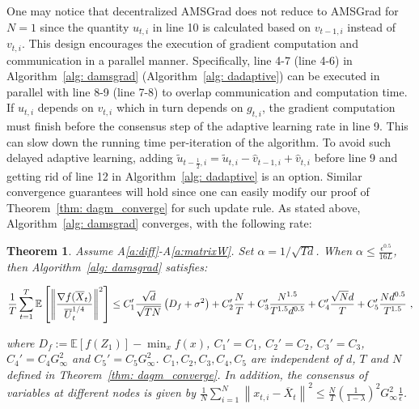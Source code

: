 \documentclass[11pt]{article}
\newtheorem{theorem}{Theorem}
\begin{document}
One may notice that decentralized AMSGrad does not reduce to AMSGrad for $N=1$ since the quantity $u_{t,i}$ in line 10 is calculated based on $v_{t-1,i}$ instead of $v_{t,i}$.
This design encourages the execution of gradient computation and communication in a parallel manner. 
Specifically, line 4-7 (line 4-6) in Algorithm~\ref{alg: damsgrad} (Algorithm~\ref{alg: dadaptive}) can be executed in parallel with line 8-9 (line 7-8) to overlap communication and computation time. 
If $u_{t,i}$ depends on $v_{t,i}$ which in turn depends on $g_{t,i}$, the gradient computation must finish before the consensus step of the adaptive learning rate in line 9. 
This can slow down the running time per-iteration of the algorithm. 
To avoid such delayed adaptive learning, adding $\tilde u_{t-\frac{1}{2},i} = \tilde u_{t,i} - \hat v_{t-1,i} + \hat v_{t,i}$ before line 9 and getting rid of line 12 in Algorithm~\ref{alg: dadaptive} is an option.
Similar convergence guarantees will hold since one can easily modify our proof of Theorem~\ref{thm: dagm_converge} for such update rule. 
As stated above, Algorithm~\ref{alg: damsgrad} converges, with the following rate:
\begin{theorem}\label{thm: dams_converge}
Assume A\ref{a:diff}-A\ref{a:matrixW}.
Set $\alpha = 1/\sqrt{Td}$. When $\alpha  \leq \frac{\epsilon^{0.5}}{16L} $, then Algorithm~\ref{alg: damsgrad} satisfies:
 
	  \begin{align}\notag
	  \frac{1}{T}\sum_{t=1}^T  \mathbb E \left [\left\|\frac{\nabla f( \overline X_{t})}{\overline U_{t}^{1/4}}\right\|^2  \right]
	  \leq  C_1' \frac{\sqrt{d}}{\sqrt{TN}} \left(D_f +    \sigma^2 \right) +  C_2' \frac{N}{T}  +  C_3' \frac{N^{1.5}}{T^{1.5}d^{0.5}} 
+  C_4' \frac{\sqrt{N}d}{T} +  C_5'  \frac{Nd^{0.5}}{T^{1.5}}  \ ,
	  \end{align}
	  
	where $D_f := \mathbb E  [f( Z_{1})]  -  \min_x  f(x)$, $C_1' = C_1$, $C_2' = C_2$, $C_3' = C_3$, $C_4' = C_4G_{\infty}^2$ and $C_5' = C_5 G_{\infty}^2 $. $C_1,C_2, C_3, C_4, C_5$ are independent of $d$, $T$ and $N$ defined in Theorem~\ref{thm: dagm_converge}. In addition, the consensus of variables at different nodes is given by $\frac{1}{N}\sum_{i=1}^N\left\| {  x_{t,i} -   \overline X_{t}}  \right\|^2   \leq \frac{N}{T} \left (\frac{1}{1-\lambda} \right)^2  G_{\infty}^2 \frac{1}{\epsilon}$. 
\end{theorem}
\end{document}

